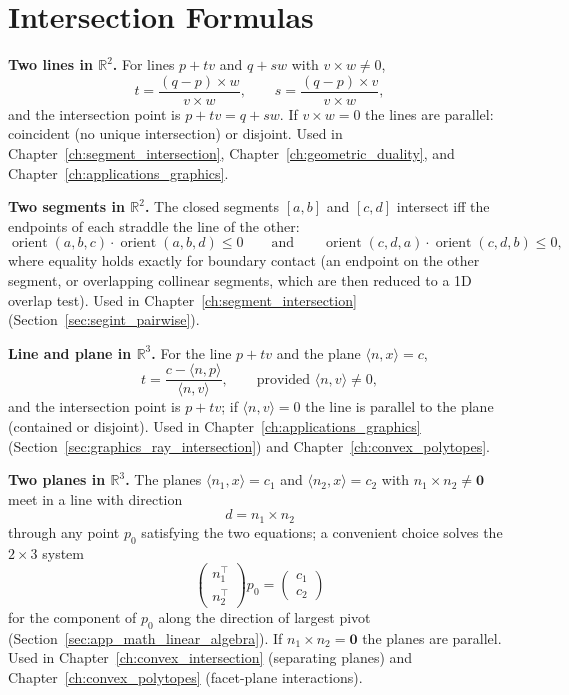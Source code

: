 
\section{Intersection Formulas}
\label{sec:app_formulas_intersections}

\medskip\noindent\textbf{Two lines in $\mathbb{R}^2$.}
For lines $p + t v$ and $q + s w$ with $v \times w \neq 0$,
\[
  t = \frac{(q - p)\times w}{v \times w},
  \qquad
  s = \frac{(q - p)\times v}{v \times w},
\]
and the intersection point is $p + t v = q + s w$. If
$v \times w = 0$ the lines are parallel: coincident (no unique
intersection) or disjoint. Used in Chapter~\ref{ch:segment_intersection},
Chapter~\ref{ch:geometric_duality}, and Chapter~\ref{ch:applications_graphics}.

\medskip\noindent\textbf{Two segments in $\mathbb{R}^2$.}
The closed segments $[a, b]$ and $[c, d]$ intersect iff the endpoints of
each straddle the line of the other:
\[
  \operatorname{orient}(a,b,c)\cdot\operatorname{orient}(a,b,d) \le 0
  \qquad\text{and}\qquad
  \operatorname{orient}(c,d,a)\cdot\operatorname{orient}(c,d,b) \le 0,
\]
where equality holds exactly for boundary contact (an endpoint on the other
segment, or overlapping collinear segments, which are then reduced to a
1D overlap test). Used in Chapter~\ref{ch:segment_intersection}
(Section~\ref{sec:segint_pairwise}).

\medskip\noindent\textbf{Line and plane in $\mathbb{R}^3$.}
For the line $p + t v$ and the plane $\langle n, x\rangle = c$,
\[
  t = \frac{c - \langle n, p\rangle}{\langle n, v\rangle},
  \qquad\text{provided } \langle n, v\rangle \neq 0,
\]
and the intersection point is $p + t v$; if $\langle n, v\rangle = 0$ the
line is parallel to the plane (contained or disjoint). Used in
Chapter~\ref{ch:applications_graphics} (Section~\ref{sec:graphics_ray_intersection})
and Chapter~\ref{ch:convex_polytopes}.

\medskip\noindent\textbf{Two planes in $\mathbb{R}^3$.}
The planes $\langle n_1, x\rangle = c_1$ and $\langle n_2, x\rangle = c_2$
with $n_1\times n_2 \neq \mathbf{0}$ meet in a line with direction
\[
  d = n_1 \times n_2
\]
through any point $p_0$ satisfying the two equations; a convenient choice
solves the $2\times 3$ system
\[
  \begin{pmatrix} n_1^\top \\ n_2^\top \end{pmatrix} p_0
  = \begin{pmatrix} c_1 \\ c_2 \end{pmatrix}
\]
for the component of $p_0$ along the direction of largest pivot
(Section~\ref{sec:app_math_linear_algebra}). If $n_1\times n_2 = \mathbf{0}$
the planes are parallel. Used in Chapter~\ref{ch:convex_intersection}
(separating planes) and Chapter~\ref{ch:convex_polytopes} (facet-plane
interactions).

